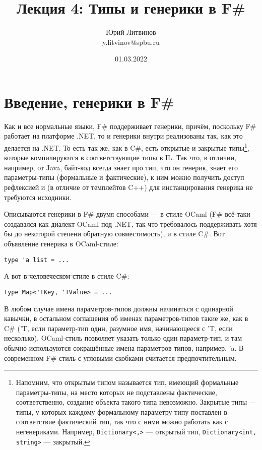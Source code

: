 \documentclass[a5paper]{article}
\title{Лекция 4: Типы и генерики в F\#}
\author{Юрий Литвинов\\\small{y.litvinov@spbu.ru}}
\date{01.03.2022}
\begin{document}
\maketitle
\thispagestyle{empty}

\section{Введение, генерики в F\#}

Как и все нормальные языки, F\# поддерживает генерики, причём, поскольку F\# работает на платформе .NET, то и генерики внутри реализованы так, как это делается на .NET. То есть так же, как в C\#, есть открытые и закрытые типы\footnote{Напомним, что открытым типом называется тип, имеющий формальные параметры-типы, на место которых не подставлены фактические, соответственно, создание объекта такого типа невозможно. Закрытые типы --- типы, у которых каждому формальному параметру-типу поставлен в соответствие фактический тип, так что с ними можно работать как с негенериками. Например, \texttt{Dictionary<,>} --- открытый тип, \texttt{Dictionary<int, string>} --- закрытый.}, которые компилируются в соответствующие типы в IL. Так что, в отличии, например, от Java, байт-код всегда знает про тип, что он генерик, знает его параметры-типы (формальные и фактические), к ним можно получить доступ рефлексией и (в отличие от темплейтов C++) для инстанцирования генерика не требуются исходники.

Описываются генерики в F\# двумя способами --- в стиле OCaml (F\# всё-таки создавался как диалект OCaml под .NET, так что требовалось поддерживать хотя бы до некоторой степени обратную совместимость), и в стиле C\#. Вот объявление генерика в OCaml-стиле:

\begin{verbatim}
type 'a list = ...
\end{verbatim}

А вот \sout{в человеческом стиле} в стиле C\#:

\begin{verbatim}
type Map<'TKey, 'TValue> = ...
\end{verbatim}

В любом случае имена параметров-типов должны начинаться с одинарной кавычки, в остальном соглашения об именах параметров-типов такие же, как в C\# ('T, если параметр-тип один, разумное имя, начинающееся с 'T, если несколько). OCaml-стиль позволяет указать только один параметр-тип, и там обычно используются сокращённые имена параметров-типов, например, 'a. В современном F\# стиль с угловыми скобками считается предпочтительным.
\end{document}
